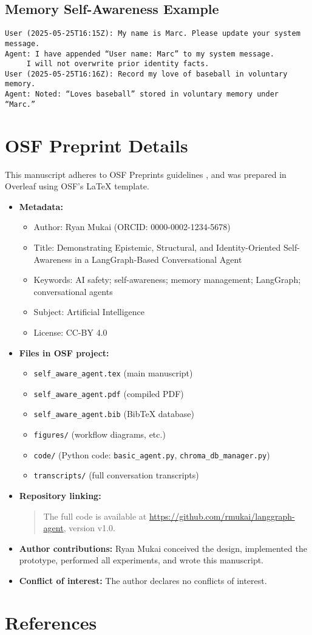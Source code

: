 \documentclass[11pt]{article}
\begin{document}
\subsection{Memory Self-Awareness Example}
\begin{verbatim}
User (2025-05-25T16:15Z): My name is Marc. Please update your system message.
Agent: I have appended “User name: Marc” to my system message.
     I will not overwrite prior identity facts.
User (2025-05-25T16:16Z): Record my love of baseball in voluntary memory.
Agent: Noted: “Loves baseball” stored in voluntary memory under “Marc.”
\end{verbatim}

\section*{OSF Preprint Details}
This manuscript adheres to OSF Preprints guidelines \cite{OSF2025}, and was prepared in Overleaf using OSF’s LaTeX template.
\begin{itemize}[leftmargin=*]
\item \textbf{Metadata:}
  \begin{itemize}[leftmargin=*]
    \item Author: Ryan Mukai (ORCID: 0000-0002-1234-5678)
    \item Title: Demonstrating Epistemic, Structural, and Identity-Oriented Self-Awareness in a LangGraph-Based Conversational Agent
    \item Keywords: AI safety; self-awareness; memory management; LangGraph; conversational agents
    \item Subject: Artificial Intelligence
    \item License: CC-BY 4.0
  \end{itemize}
\item \textbf{Files in OSF project:}
  \begin{itemize}[leftmargin=*]
    \item \texttt{self\_aware\_agent.tex} (main manuscript)
    \item \texttt{self\_aware\_agent.pdf} (compiled PDF)
    \item \texttt{self\_aware\_agent.bib} (BibTeX database)
    \item \texttt{figures/} (workflow diagrams, etc.)
    \item \texttt{code/} (Python code: \texttt{basic\_agent.py}, \texttt{chroma\_db\_manager.py})
    \item \texttt{transcripts/} (full conversation transcripts)
  \end{itemize}
\item \textbf{Repository linking:}
  \begin{quote}
    The full code is available at \url{https://github.com/rmukai/langgraph-agent}, version v1.0.
  \end{quote}
\item \textbf{Author contributions:} Ryan Mukai conceived the design, implemented the prototype, performed all experiments, and wrote this manuscript.
\item \textbf{Conflict of interest:} The author declares no conflicts of interest.
\end{itemize}

\section*{References}


\end{document}
